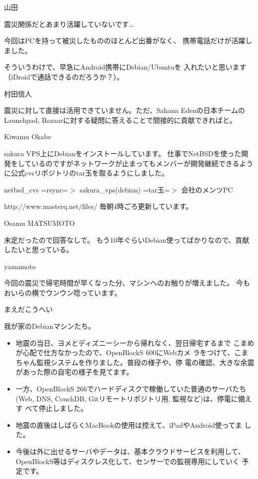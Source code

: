 \begin{prework}{ 山田 }

震災関係だとあまり活躍していないです…

今回はPCを持って被災したもののほとんど出番がなく、
携帯電話だけが活躍しました。

そういうわけで、早急にAndroid携帯にDebian/Ubuntuを
入れたいと思います（iDroidで通話できるのだろうか？）。
\end{prework}

\begin{prework}{ 村田信人 }

震災に対して直接は活用できていません。ただ、Sahana Edenの日本チームのLaunchpad, Bazaarに対する疑問に答えることで間接的に貢献できればと。
\end{prework}

\begin{prework}{ Kiwamu Okabe }

sakura VPS上にDebianをインストールしています。
仕事でNetBSDを使った開発をしているのですがネットワークが止まってもメンバーが開発継続できるように公式cvsリポジトリのtar玉を取るようにしました。

netbsd\_cvs =rsync=$>$ sakura\_vps(debian) =tar玉=$>$ 会社のメンツPC

http://www.masterq.net/files/
毎朝4時ごろ更新しています。
\end{prework}

\begin{prework}{ Osamu MATSUMOTO }

未定だったので回答なしで。
もう10年ぐらいDebian使ってばかりなので、貢献したいと思っている。
\end{prework}

\begin{prework}{ yamamoto }

今回の震災で帰宅時間が早くなった分、マシンへのお触りが増えました。
今もおいらの横でウンウン唸っています。
\end{prework}

\begin{prework}{ まえだこうへい }

我が家のDebianマシンたち。
\begin{itemize}
 \item 地震の当日、ヨメとディズニーシーから帰れなく、翌日帰宅するまで
       こまめが心配で仕方なかったので、OpenBlockS 600にWebカメ
       ラをつけて、こまちゃん監視システムを作りました。普段の様子や、停
       電の確認、大きな余震があった際の自宅の様子を見てます。
 \item 一方、OpenBlockS 266でハードディスクで稼働していた普通のサーバたち(Web,
       DNS, CouchDB, Gitリモートリポジトリ用, 監視など)は、停電に備えす
       べて停止しました。
 \item 地震の直後はしばらくMacBookの使用は控えて、iPadやAndroid使ってま
       した。
 \item 今後は外に出せるサーバやデータは、基本クラウドサービスを利用して、
       OpenBlockS等はディスクレス化して、センサーでの監視専用にしていく
       予定です。
\end{itemize}

\end{prework}
